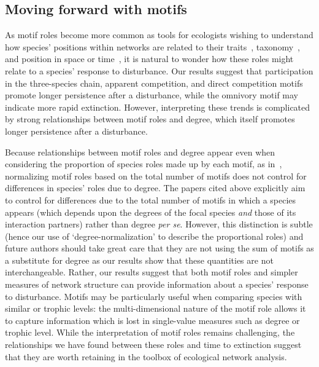 \documentclass[12pt]{article}
\begin{document}
\begin{spacing}{2.0}
	\subsection*{Moving forward with motifs}	

        As motif roles become more common as tools for ecologists wishing to understand how species' positions within networks are related to their traits~\citep{Cirtwill2018EcolLett}, taxonomy~\citep{Stouffer2007}, and position in space or time~\citep{Baker2015}, it is natural to wonder how these roles might relate to a species' response to disturbance. 
        Our results suggest that participation in the three-species chain, apparent competition, and direct competition motifs promote longer persistence after a disturbance, while the omnivory motif may indicate more rapid extinction.
        However, interpreting these trends is complicated by strong relationships between motif roles and degree, which itself promotes longer persistence after a disturbance.
        
        
	    Because relationships between motif roles and degree appear even when considering the proportion of species roles made up by each motif, as in~\citet{Baker2015,Cirtwill2015,Simmons2019}, normalizing motif roles based on the total number of motifs does not control for differences in species' roles due to degree.
	    The papers cited above explicitly aim to control for differences due to the total number of motifs in which a species appears (which depends upon the degrees of the focal species \emph{and} those of its interaction partners) rather than degree \emph{per se}.
	    However, this distinction is subtle (hence our use of `degree-normalization' to describe the proportional roles) and future authors should take great care that they are not using the sum of motifs as a substitute for degree as our results show that these quantities are not interchangeable.
        Rather, our results suggest that both motif roles and simpler measures of network structure can provide information about a species' response to disturbance.
        Motifs may be particularly useful when comparing species with similar  or trophic levels: the multi-dimensional nature of the motif role allows it to capture information which is lost in single-value measures such as degree or trophic level.
        While the interpretation of motif roles remains challenging, the relationships we have found between these roles and time to extinction suggest that they are worth retaining in the toolbox of ecological network analysis.
        


\end{spacing}
\end{document}
